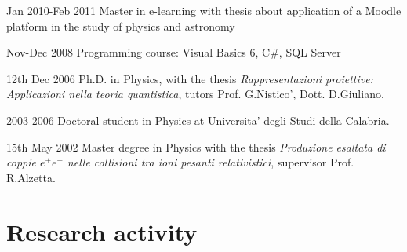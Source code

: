 \begin{CV}
\item[Jan 2010-Feb 2011] Master in e-learning with thesis about application of a Moodle platform in the study of physics and astronomy

\item[Nov-Dec 2008] Programming course: Visual Basics 6, C\#, SQL Server

\item[12th Dec 2006] Ph.D. in Physics, with the thesis {\em Rappresentazioni proiettive: Applicazioni nella teoria quantistica}, tutors Prof. G.Nistico', Dott. D.Giuliano.

\item[2003-2006] Doctoral student in Physics at Universita' degli Studi della Calabria.

\item[15th May 2002] Master degree in Physics with the thesis {\em Produzione esaltata di coppie $e^+ e^-$ nelle collisioni tra ioni pesanti relativistici}, supervisor Prof. R.Alzetta.
\end{CV}

\section{Research activity}
